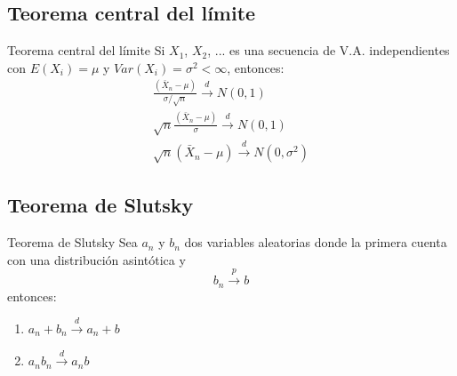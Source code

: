 \subsection{Teorema central del límite}
\begin{frame}{Teorema central del límite}
	Si $X_1$, $X_2$, ... es una secuencia de V.A. independientes con $E(X_i)=\mu$ y $Var(X_i)=\sigma^2 < \infty$, entonces:
		\begin{gather*}
			\frac{(\bar X_n - \mu)}{\sigma/\sqrt{n}} \xrightarrow{d} N(0,1)\\
			\sqrt{n}\frac{(\bar X_n - \mu)}{\sigma} \xrightarrow{d} N(0,1)\\
			\sqrt{n}(\bar X_n - \mu) \xrightarrow{d} N(0,\sigma^2)
		\end{gather*}
\end{frame}

\subsection{Teorema de Slutsky}
\begin{frame}{Teorema de Slutsky}
	Sea $a_n$ y $b_n$ dos variables aleatorias donde la primera cuenta con una distribución asintótica y 
		$$ b_n \xrightarrow{p} b $$
	entonces:
		\begin{enumerate}
			\item $ a_n+b_n \xrightarrow{d} a_n+b $
			\item $ a_n b_n \xrightarrow{d} a_n b $	
		\end{enumerate}
\end{frame}